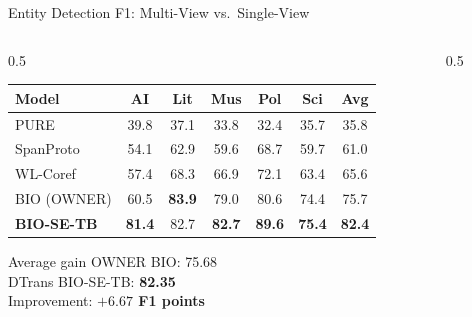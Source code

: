 \documentclass[aspectratio=169,10pt]{beamer}
\newcommand{\hg}[1]{\textcolor{dkgreen}{\textbf{#1}}}
\begin{document}
\begin{frame}{Entity Detection F1: Multi-View vs.\ Single-View}
  \begin{columns}[T]
    \begin{column}{0.5\textwidth}
      \footnotesize
      \setlength{\tabcolsep}{3pt}
      \renewcommand{\arraystretch}{1.2}
      \begin{tabular}{l|ccccc|c}
        \toprule
        \textbf{Model} & AI & Lit & Mus & Pol & Sci & \textbf{Avg} \\
        \midrule
        PURE       & 39.8 & 37.1 & 33.8 & 32.4 & 35.7 & 35.8 \\
        SpanProto  & 54.1 & 62.9 & 59.6 & 68.7 & 59.7 & 61.0 \\
        WL-Coref   & 57.4 & 68.3 & 66.9 & 72.1 & 63.4 & 65.6 \\
        BIO (OWNER)& 60.5 & \textbf{83.9} & 79.0 & 80.6 & 74.4 & 75.7 \\
        \rowcolor{gold!25}
        \textbf{BIO-SE-TB} & \textbf{81.4} & 82.7 & \textbf{82.7} & \textbf{89.6} & \textbf{75.4} & \textbf{82.4} \\
        \bottomrule
      \end{tabular}
      \vspace{0.3em}
      \normalsize
      \begin{block}{Average gain}
        OWNER BIO: 75.68\\
        DTrans BIO-SE-TB: \textbf{82.35}\\
        Improvement: \hg{$+6.67$ F1 points}
      \end{block}
    \end{column}
    \begin{column}{0.5\textwidth}
\end{column}
\end{columns}
\end{frame}
\end{document}
